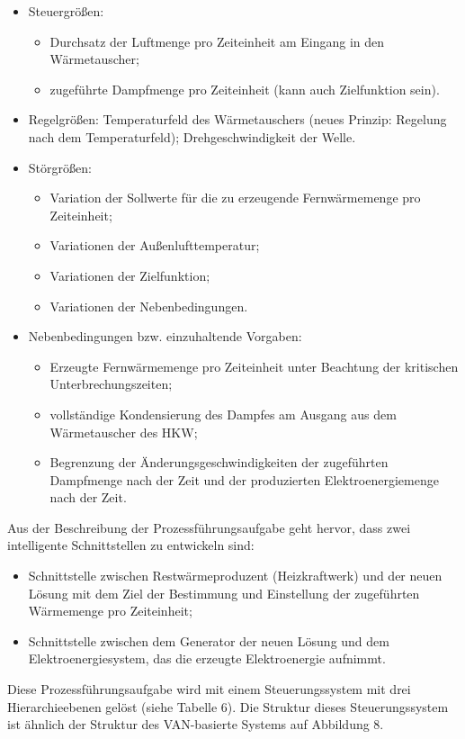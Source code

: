 \documentclass[11pt,a4paper]{article}
\begin{document}
\begin{itemize}
\item	Steuergrößen: 
\begin{itemize}
\item Durchsatz der Luftmenge pro Zeiteinheit am Eingang in den Wärmetauscher;
\item zugeführte Dampfmenge pro Zeiteinheit (kann auch Zielfunktion sein).
\end{itemize}
\item Regelgrößen: Temperaturfeld des Wärmetauschers (neues Prinzip: Regelung
  nach dem Temperaturfeld); Drehgeschwindigkeit der Welle.
\item Störgrößen:
\begin{itemize}
\item Variation der Sollwerte für die zu erzeugende Fernwärmemenge pro
  Zeiteinheit;
\item Variationen der Außenlufttemperatur;
\item Variationen der Zielfunktion;
\item Variationen der Nebenbedingungen.
\end{itemize}
\item Nebenbedingungen bzw. einzuhaltende Vorgaben:
  \begin{itemize}
  \item Erzeugte Fernwärmemenge pro Zeiteinheit unter Beachtung der kritischen
    Unterbrechungszeiten;
  \item vollständige Kondensierung des Dampfes am Ausgang aus dem Wärmetauscher
    des HKW;
  \item Begrenzung der Änderungsgeschwindigkeiten der zugeführten Dampfmenge
    nach der Zeit und der produzierten Elektroenergiemenge nach der Zeit.
  \end{itemize}
\end{itemize}
Aus der Beschreibung der Prozessführungsaufgabe geht hervor, dass zwei
intelligente Schnittstellen zu entwickeln sind:
\begin{itemize}
\item Schnittstelle zwischen Restwärmeproduzent (Heizkraftwerk) und der neuen
  Lösung mit dem Ziel der Bestimmung und Einstellung der zugeführten
  Wärmemenge pro Zeiteinheit;
\item Schnittstelle zwischen dem Generator der neuen Lösung und dem
  Elektroenergiesystem, das die erzeugte Elektroenergie aufnimmt.
\end{itemize}
Diese Prozessführungsaufgabe wird mit einem Steuerungssystem mit drei
Hierarchieebenen gelöst (siehe Tabelle 6). Die Struktur dieses Steuerungssystem
ist ähnlich der Struktur des VAN-basierte Systems auf Abbildung 8.
\end{document}
